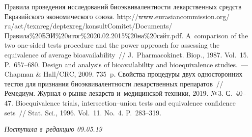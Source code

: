 \begin{multicols}{2}
{{\begin{thebibliography}{9}
    Правила проведения исследований биоэквивалентности лекарственных 
    средств Евразийского экономического союза. 
    {\sf 
    http://www.eurasiancommission.org/ ru/act/texnreg/deptexreg/konsultComitet/Documents/\linebreak Правила\%20БЭИ\%20итог\%2020.02.2015\%20на\%20\linebreak сайт.pdf}.
    A~comparison of the two one-sided tests procedure and the power approach 
    for assessing the equivalence of average bioavailability~// J.~Pharmacokinet. 
    Biop., 1987. Vol.~15. P.~657--680.
    Design and analysis of bioavailability and bioequivalence studies.~--- 
    Chapman \& Hall/CRC, 2009. 735~p.
    Свойства процедуры двух односторонних тестов 
    для признания биоэквивалентности лекарственных препаратов~// Ремедиум. 
    Журнал о рынке лекарств и~медицинской техники, 2019. №\,3. С.~40--47.
      
    Bioequivalence trials, intersection--union tests and equivalence confidence sets~// 
    Stat. Sci., 1996. Vol.~11. No.~4. P.~283--319.
    
     \end{thebibliography}

 }
 }

\end{multicols}

\vspace*{-12pt}

\hfill{\small\textit{Поступила в~редакцию 09.05.19}}


\pagebreak


\vspace*{-28pt}





\def\tit{EVALUATION OF THE SIGNIFICANCE LEVEL IN~SCHUIRMANN'S TEST FOR~CHECKING 
THE~BIOEQUIVALENCE HYPOTHESIS IN~MISSING DATA CONDITIONS}


\def\titkol{Evaluation of the significance level in~Schuirmann's test for~checking 
the~bioequivalence hypothesis in~missing data conditions}

